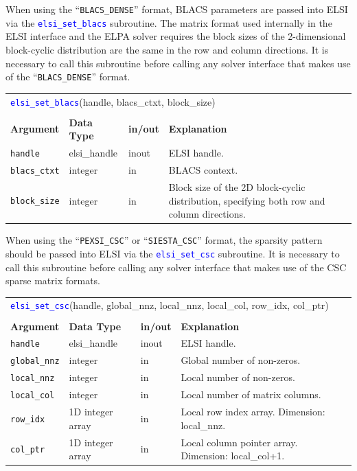 \documentclass{report}
\newcommand{\api}[1]{\textcolor{blue}{\texttt{#1}}}
\begin{document}
When using the ``\texttt{BLACS\_DENSE}'' format, BLACS parameters are passed into ELSI via the \api{elsi\_set\_blacs} subroutine. The matrix format used internally in the ELSI interface and the ELPA solver requires the block sizes of the 2-dimensional block-cyclic distribution are the same in the row and column directions. It is necessary to call this subroutine before calling any solver interface that makes use of the ``\texttt{BLACS\_DENSE}'' format.

\begin{tabular}[]{|p{20mm}|p{20mm}|p{10mm}|p{112mm}|}
\multicolumn{4}{l}{\api{elsi\_set\_blacs}(handle, blacs\_ctxt, block\_size)}\\
\multicolumn{4}{l}{}\\
\hline
\multicolumn{1}{|l|}{\textbf{Argument}} & \multicolumn{1}{l|}{\textbf{Data Type}} & \multicolumn{1}{l|}{\textbf{in/out}} & \multicolumn{1}{l|}{\textbf{Explanation}}\\
\hline
\texttt{handle}      & elsi\_handle & inout & ELSI handle.\\
\hline
\texttt{blacs\_ctxt} & integer      & in    & BLACS context.\\
\hline
\texttt{block\_size} & integer      & in    & Block size of the 2D block-cyclic distribution, specifying both row and column directions.\\
\hline
\end{tabular}

When using the ``\texttt{PEXSI\_CSC}'' or ``\texttt{SIESTA\_CSC}'' format, the sparsity pattern should be passed into ELSI via the \api{elsi\_set\_csc} subroutine. It is necessary to call this subroutine before calling any solver interface that makes use of the CSC sparse matrix formats.

\begin{tabular}[]{|p{20mm}|p{40mm}|p{10mm}|p{92mm}|}
\multicolumn{4}{l}{\api{elsi\_set\_csc}(handle, global\_nnz, local\_nnz, local\_col, row\_idx, col\_ptr)}\\
\multicolumn{4}{l}{}\\
\hline
\multicolumn{1}{|l|}{\textbf{Argument}} & \multicolumn{1}{l|}{\textbf{Data Type}} & \multicolumn{1}{l|}{\textbf{in/out}} & \multicolumn{1}{l|}{\textbf{Explanation}}\\
\hline
\texttt{handle}      & elsi\_handle     & inout & ELSI handle.\\
\hline
\texttt{global\_nnz} & integer          & in    & Global number of non-zeros.\\
\hline
\texttt{local\_nnz}  & integer          & in    & Local number of non-zeros.\\
\hline
\texttt{local\_col}  & integer          & in    & Local number of matrix columns.\\
\hline
\texttt{row\_idx}    & 1D integer array & in    & Local row index array. Dimension: local\_nnz.\\
\hline
\texttt{col\_ptr}    & 1D integer array & in    & Local column pointer array. Dimension: local\_col+1.\\
\hline
\end{tabular}
\end{document}

